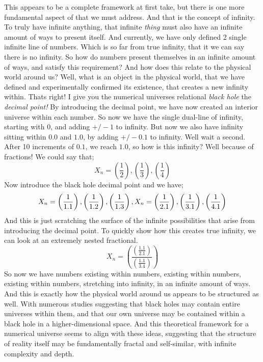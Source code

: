 \documentclass[11pt]{article}
\newcommand{\be}{\begin{equation}}
\newcommand{\ee}{\end{equation}}
\begin{document}
        This appears to be a complete framework at first take, but there is one more fundamental aspect of that we must address.
        And that is the concept of infinity.
        To truly have infinite anything, that infinite \emph{thing} must also have an infinite amount of ways to present itself.
        And currently, we have only defined 2 single infinite line of numbers.
        Which is so far from true infinity, that it we can say there is no infinity.
        So how do numbers present themselves in an infinite amount of ways, and satisfy this requirement?
        And how does this relate to the physical world around us?
        Well, what is an object in the physical world, that we have defined and experimentally confirmed its existence, that creates a new infinity within.
        Thats right!
        I give you the numerical universes relational \emph{black hole} the \emph{decimal point!}
        By introducing the decimal point, we have now created an interior universe within each number.
        So now we have the single dual-line of infinity, starting with $0$, and adding $+/-1$ to infinity.
        But now we also have infinity sitting within $0.0$ and $1.0$, by adding $+/-0.1$ to infinity.
        Well wait a second. After 10 increments of $0.1$, we reach $1.0$, so how is this infinity?
        Well because of fractions!
        We could say that;
        \be
            X_n = \left(\frac{1}{2}\right), \left(\frac{1}{3}\right), \left(\frac{1}{4}\right)
        \ee
        Now introduce the black hole decimal point and we have;
        \be
            X_n = \left(\frac{1}{1.1}\right), \left(\frac{1}{1.2}\right), \left(\frac{1}{1.3}\right), \\
            X_n = \left(\frac{1}{2.1}\right), \left(\frac{1}{3.1}\right), \left(\frac{1}{4.1}\right)
        \ee
        And this is just scratching the surface of the infinite possibilities that arise from introducing the decimal point.
        To quickly show how this creates true infinity, we can look at an extremely nested fractional.
        \be
            X_n = \left(\frac{\left(\frac{1.1}{2.1}\right)}{\left(\frac{1.1}{3.4}\right)}\right)
        \ee
        So now we have numbers existing within numbers, existing within numbers, existing within numbers, stretching into infinity, in an infinite amount of ways.
        And this is exactly how the physical world around us appears to be structured as well.
        With numerous studies suggesting that black holes may contain entire universes within them, and that our own universe may be contained within a black hole in a higher-dimensional space.
        And this theoretical framework for a numerical universe seems to align with these ideas, suggesting that the structure of reality itself may be fundamentally fractal and self-similar, with infinite complexity and depth.
\end{document}
